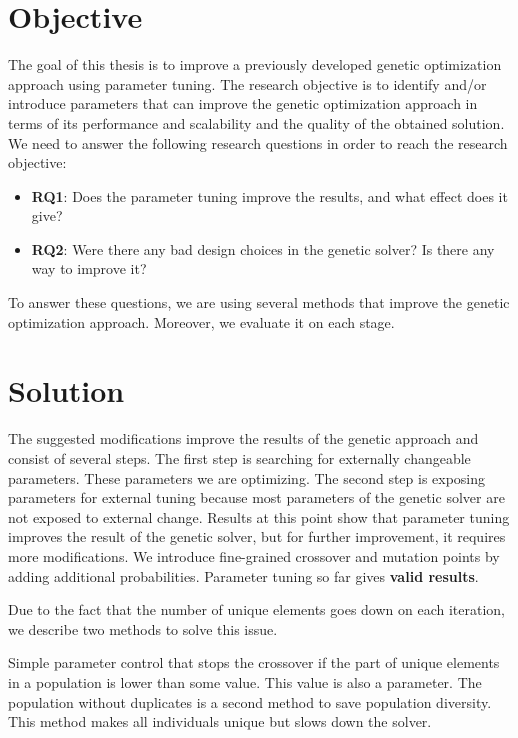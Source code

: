\section{Objective}
The goal of this thesis is to improve a previously developed genetic optimization approach using parameter tuning.
The research objective is to identify and/or introduce parameters that can improve the genetic optimization approach in terms of its performance and scalability and the quality of the obtained solution. We need to answer the following research questions in order to reach the research objective: 
\begin{itemize}
	\item \textbf{RQ1}: Does the parameter tuning improve the results, and what effect does it give?
	\item \textbf{RQ2}: Were there any bad design choices in the genetic solver? Is there any way to improve it?
\end{itemize}

To answer these questions, we are using several methods that improve the genetic optimization approach. Moreover, we evaluate it on each stage. 

\section{Solution}

The suggested modifications improve the results of the genetic approach and consist of several steps.
The first step is searching for externally changeable parameters. These parameters we are optimizing. 
The second step is exposing parameters for external tuning because most parameters of the genetic solver are not exposed to external change.
Results at this point show that parameter tuning improves the result of the genetic solver, but for further improvement, it requires more modifications.
We introduce fine-grained crossover and mutation points by adding additional probabilities. Parameter tuning so far gives \textbf{valid results}. 

Due to the fact that the number of unique elements goes down on each iteration, we describe two methods to solve this issue.

Simple parameter control that stops the crossover if the part of unique elements in a population is lower than some value. This value is also a parameter. 
The population without duplicates is a second method to save population diversity. This method makes all individuals unique but slows down the solver.

